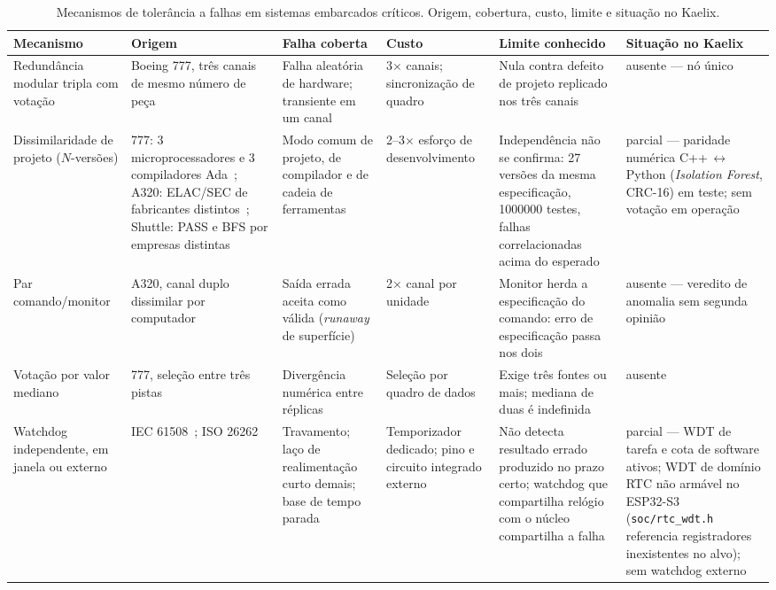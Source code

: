 \documentclass[10pt,a4paper,landscape]{article}
\begin{document}
\begin{table}[!p]
\centering
\caption{Mecanismos de tolerância a falhas em sistemas embarcados críticos. Origem, cobertura, custo, limite e situação no Kaelix.}
\label{tab:praticas}
\scriptsize
\renewcommand{\arraystretch}{1.25}
\begin{tabularx}{\textwidth}{@{}Y{0.80}Y{0.80}Y{1.10}Y{0.82}Y{1.26}Y{1.22}@{}}
\toprule
\textbf{Mecanismo} & \textbf{Origem} & \textbf{Falha coberta} & \textbf{Custo} & \textbf{Limite conhecido} & \textbf{Situação no Kaelix} \\
\midrule

Redundância modular tripla com votação &
Boeing 777, três canais de mesmo número de peça~\cite{yeh1996} &
Falha aleatória de hardware; transiente em um canal &
3$\times$ canais; sincronização de quadro &
Nula contra defeito de projeto replicado nos três canais &
\textsf{ausente} --- nó único \\

Dissimilaridade de projeto ($N$-versões) &
777: 3 microprocessadores e 3 compiladores Ada~\cite{yeh1996}; A320: ELAC/SEC de fabricantes distintos~\cite{briere1993}; Shuttle: PASS e BFS por empresas distintas~\cite{nasa2011} &
Modo comum de projeto, de compilador e de cadeia de ferramentas &
2--3$\times$ esforço de desenvolvimento &
Independência não se confirma: 27 versões da mesma especificação, \num{1000000} testes, falhas correlacionadas acima do esperado~\cite{knight1986} &
\textsf{parcial} --- paridade numérica C++\,$\leftrightarrow$\,Python (\emph{Isolation Forest}, CRC-16) em teste; sem votação em operação \\

Par comando/monitor &
A320, canal duplo dissimilar por computador~\cite{briere1993} &
Saída errada aceita como válida (\emph{runaway} de superfície) &
2$\times$ canal por unidade &
Monitor herda a especificação do comando: erro de especificação passa nos dois &
\textsf{ausente} --- veredito de anomalia sem segunda opinião \\

Votação por valor mediano &
777, seleção entre três pistas~\cite{yeh1996} &
Divergência numérica entre réplicas &
Seleção por quadro de dados &
Exige três fontes ou mais; mediana de duas é indefinida &
\textsf{ausente} \\

Watchdog independente, em janela ou externo &
IEC 61508~\cite{iec61508}; ISO 26262~\cite{iso26262} &
Travamento; laço de realimentação curto demais; base de tempo parada &
Temporizador dedicado; pino e circuito integrado externo &
Não detecta resultado errado produzido no prazo certo; watchdog que compartilha relógio com o núcleo compartilha a falha &
\textsf{parcial} --- WDT de tarefa e cota de software ativos; WDT de domínio RTC não armável no ESP32-S3 (\texttt{soc/rtc\_wdt.h} referencia registradores inexistentes no alvo); sem watchdog externo \\


\end{tabularx}
\end{table}
\end{document}
